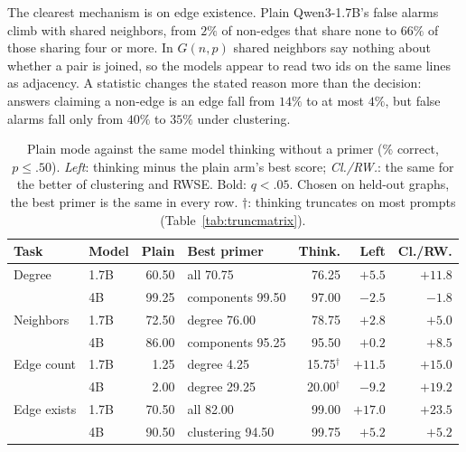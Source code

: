 \documentclass[11pt]{article}
\begin{document}
The clearest mechanism is on edge existence. Plain Qwen3-1.7B's false alarms climb with shared neighbors, from $2\%$ of non-edges that share none to $66\%$ of those sharing four or more. In $G(n,p)$ shared neighbors say nothing about whether a pair is joined, so the models appear to read two ids on the same lines as adjacency. %
A statistic changes the stated reason more than the decision: answers claiming a non-edge is an edge fall from $14\%$ to at most $4\%$, but false alarms fall only from $40\%$ to $35\%$ under clustering. %

\begin{table}[t]
\centering\scriptsize
\setlength{\tabcolsep}{2.2pt}
\begin{tabular}{llrlrrr}
\toprule
Task & Model & Plain & Best primer & Think. & Left & Cl./RW.\\
\midrule
Degree & 1.7B & 60.50 & all 70.75 & 76.25 & $\mathbf{+5.5}$ & $\mathbf{+11.8}$\\ %
 & 4B & 99.25 & components 99.50 & 97.00 & $\mathbf{-2.5}$ & $-1.8$\\ %
\addlinespace[2pt]
Neighbors & 1.7B & 72.50 & degree 76.00 & 78.75 & $+2.8$ & $\mathbf{+5.0}$\\ %
 & 4B & 86.00 & components 95.25 & 95.50 & $+0.2$ & $\mathbf{+8.5}$\\ %
\addlinespace[2pt]
Edge count & 1.7B & 1.25 & degree 4.25 & 15.75$^{\dagger}$ & $\mathbf{+11.5}$ & $\mathbf{+15.0}$\\ %
 & 4B & 2.00 & degree 29.25 & 20.00$^{\dagger}$ & $\mathbf{-9.2}$ & $\mathbf{+19.2}$\\ %
\addlinespace[2pt]
Edge exists & 1.7B & 70.50 & all 82.00 & 99.00 & $\mathbf{+17.0}$ & $\mathbf{+23.5}$\\ %
 & 4B & 90.50 & clustering 94.50 & 99.75 & $\mathbf{+5.2}$ & $\mathbf{+5.2}$\\ %
\bottomrule
\end{tabular}
\caption{Plain mode against the same model thinking without a primer (\% correct, $p\leq.50$). \emph{Left}: thinking minus the plain arm's best score; \emph{Cl./RW.}: the same for the better of clustering and RWSE. Bold: $q<.05$. Chosen on held-out graphs, the best primer is the same in every row. $\dagger$: thinking truncates on most prompts (Table~\ref{tab:truncmatrix}).} %
\label{tab:vsthink}
\end{table}
\end{document}
